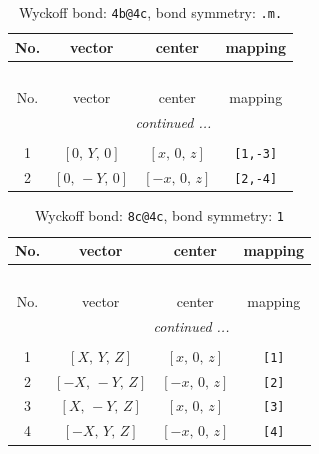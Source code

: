 \documentclass[fleqn,8pt]{jsarticle}
\begin{document}
\renewcommand{\arraystretch}{1.2}
\begin{longtable}{cccc}
\caption{Wyckoff bond: {\tt 4b@4c}, bond symmetry: {\tt .m.}}
 \\
 \hline \hline
No. & vector & center & mapping \\ \hline \endfirsthead

\multicolumn{3}{l}{\tablename\ \thetable{}} \\
 \hline \hline
No. & vector & center & mapping \\ \hline \endhead

 \hline \hline
\multicolumn{3}{r}{\footnotesize\it continued ...} \\ \endfoot

 \hline \hline
\multicolumn{3}{r}{} \\ \endlastfoot

1 & $\left[ 0,\, Y,\, 0 \right]$ & $\left[ x,\, 0,\, z \right]$ & {\tt [1,-3]} \\ \hline
2 & $\left[ 0,\, - Y,\, 0 \right]$ & $\left[ - x,\, 0,\, z \right]$ & {\tt [2,-4]} \\
\end{longtable}
\renewcommand{\arraystretch}{1.2}
\begin{longtable}{cccc}
\caption{Wyckoff bond: {\tt 8c@4c}, bond symmetry: {\tt 1}}
 \\
 \hline \hline
No. & vector & center & mapping \\ \hline \endfirsthead

\multicolumn{3}{l}{\tablename\ \thetable{}} \\
 \hline \hline
No. & vector & center & mapping \\ \hline \endhead

 \hline \hline
\multicolumn{3}{r}{\footnotesize\it continued ...} \\ \endfoot

 \hline \hline
\multicolumn{3}{r}{} \\ \endlastfoot

1 & $\left[ X,\, Y,\, Z \right]$ & $\left[ x,\, 0,\, z \right]$ & {\tt [1]} \\ \hline
2 & $\left[ - X,\, - Y,\, Z \right]$ & $\left[ - x,\, 0,\, z \right]$ & {\tt [2]} \\ \hline
3 & $\left[ X,\, - Y,\, Z \right]$ & $\left[ x,\, 0,\, z \right]$ & {\tt [3]} \\ \hline
4 & $\left[ - X,\, Y,\, Z \right]$ & $\left[ - x,\, 0,\, z \right]$ & {\tt [4]} \\
\end{longtable}
\end{document}
